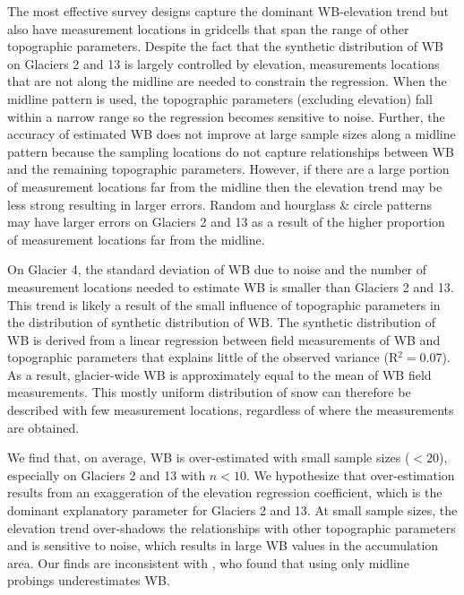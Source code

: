 \documentclass[twocolumn,letterpaper]{igs}
\begin{document}
The most effective survey designs capture the dominant WB-elevation trend but also have measurement locations in gridcells that span the range of other topographic parameters. Despite the fact that the synthetic distribution of WB on Glaciers 2 and 13 is largely controlled by elevation, measurements locations that are not along the midline are needed to constrain the regression. When the midline pattern is used, the topographic parameters (excluding elevation) fall within a narrow range so the regression becomes sensitive to noise. Further, the accuracy of estimated WB does not improve at large sample sizes along a midline pattern because the sampling locations do not capture relationships between WB and the remaining topographic parameters. However, if there are a large portion of measurement locations far from the midline then the elevation trend may be less strong resulting in larger errors. Random and hourglass \& circle patterns may have larger errors on Glaciers 2 and 13 as a result of the higher proportion of measurement locations far from the midline. 

On Glacier 4, the standard deviation of WB due to noise and the number of measurement locations needed to estimate WB is smaller than Glaciers 2 and 13. This trend is likely a result of the small influence of topographic parameters in the distribution of synthetic distribution of WB. The synthetic distribution of WB is derived from a linear regression between field measurements of WB and topographic parameters that explains little of the observed variance (R$^2=$0.07). As a result, glacier-wide WB is approximately equal to the mean of WB field measurements. This mostly uniform distribution of snow can therefore be described with few measurement locations, regardless of where the measurements are obtained. 

We find that, on average, WB is over-estimated with small sample sizes ($<20$), especially on Glaciers 2 and 13 with $n<10$. We hypothesize that over-estimation results from an exaggeration of the elevation regression coefficient, which is the dominant explanatory parameter for Glaciers 2 and 13. At small sample sizes, the elevation trend over-shadows the relationships with other topographic parameters and is sensitive to noise, which results in large WB values in the accumulation area. Our finds are inconsistent with \cite{Walmsley2015}, who found that using only midline probings underestimates WB.
\end{document}
